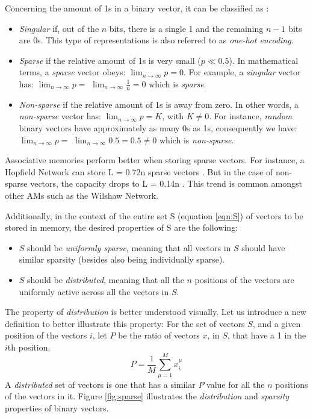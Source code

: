 \documentclass{article}
\begin{document}
Concerning the amount of 1s in a binary vector, it can be classified as \cite{palm1996associative}:
\begin{itemize}
    \item \textit{Singular} if, out of the $n$ bits, there is a single 1 and the remaining $n-1$ bits are 0s. This type of representations is also referred to as \textit{one-hot encoding}.
    \item \textit{Sparse} if the relative amount of 1s is very small ($p\ll0.5$). In mathematical terms, a\textit{ sparse }vector obeys: $\lim _{n \rightarrow \infty} p=0$. For example, a \textit{singular} vector has: $\lim _{n \rightarrow \infty} p = $ $ \lim _{n \rightarrow \infty} \frac{1}{n} = 0$ which is \textit{sparse}.
    \item \textit{Non-sparse} if the relative amount of 1s is away from zero. In other words, a \textit{non-sparse} vector has: $\lim _{n \rightarrow \infty} p=K$, with $K \neq 0$. For instance, \textit{random} binary vectors have approximately as many 0s as 1s, consequently we have: $\lim _{n \rightarrow \infty} p = $ $ \lim _{n \rightarrow \infty} 0.5 = 0.5 \neq 0$ which is \textit{non-sparse}.
\end{itemize}
Associative memories perform better when storing sparse vectors. For instance, a Hopfield Network can store L = 0.72n sparse vectors \cite{gardner1988space}. But in the case of non-sparse vectors, the capacity drops to L = 0.14n \cite{hopfield1982neural}. This trend is common amongst other AMs such as the Wilshaw Network.
\newline

Additionally, in the context of the entire set S (equation \ref{eqn:S}) of vectors to be stored in memory, the desired properties of S are the following:
\begin{itemize}
    \item $S$ should be \textit{uniformly sparse}, meaning that all vectors in $S$ should have similar sparsity (besides also being individually sparse).
    \item $S$ should be \textit{distributed}, meaning that all the $n$ positions of the vectors are uniformly active across all the vectors in $S$.
\end{itemize}

The property of \textit{distribution} is better understood visually. Let us introduce a new definition to better illustrate this property:
\newline
For the set of vectors $S$, and a given position of the vectors $i$, let $P$ be the ratio of vectors $x$, in $S$, that have a 1 in the $i$th position.
\begin{equation}
\label{eqn:P}
    P = \frac{1}{M}\sum_{\mu=1}^{M}x^{\mu}_i
\end{equation}
A \textit{distributed} set of vectors is one that has a similar $P$ value for all the $n$ positions of the vectors in it. Figure \ref{fig:sparse} illustrates the \textit{distribution} and \textit{sparsity} properties of binary vectors.
\end{document}
